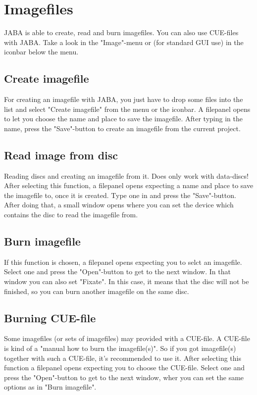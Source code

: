 \documentclass[a4paper,11pt]{article}
\begin{document}
\section{Imagefiles}

JABA is able to create, read and burn imagefiles. You can also use CUE-files with
JABA.
Take a look in the "Image"-menu or (for standard GUI use) in the iconbar below the
menu.

\subsection{Create imagefile}

For creating an imagefile with JABA, you just have to drop some files into the list and
select "Create imagefile" from the menu or the iconbar. A filepanel opens to let you
choose the name and place to save the imagefile. After typing in the name, press the
"Save"-button to create an imagefile from the current project.

\subsection{Read image from disc}

Reading discs and creating an imagefile from it. Does only work with data-discs!
After selecting this function, a filepanel opens expecting a name and place to save the
imagefile to, once it is created. Type one in and press the "Save"-button.
After doing that, a small window opens where you can set the device which contains the
disc to read the imagefile from.

\subsection{Burn imagefile}

If this function is chosen, a filepanel opens expecting you to selct an imagefile.
Select one and press the "Open"-button to get to the next window.
In that window you can also set "Fixate". In this case, it means that the disc will not be
finished, so you can burn another imagefile on the same disc.

\subsection{Burning CUE-file}

Some imagefiles (or sets of imagefiles) may provided with a CUE-file.
A CUE-file is kind of a "manual how to burn the imagefile(s)".
So if you got imagefile(s) together with such a CUE-file, it's recommended to use it.
After selecting this function a filepanel opens expecting you to choose the CUE-file.
Select one and press the "Open"-button to get to the next window, wher you can set the
same options as in "Burn imagefile".
\end{document}

